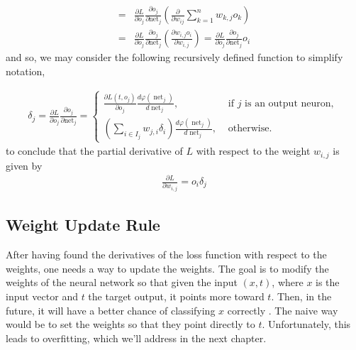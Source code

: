 \documentclass[nobib]{tufte-handout} %
\DeclareMathOperator{\net}{net}
\begin{document}
\begin{enumerate}
\begin{equation}
\begin{split}
    =& {\frac {\partial L}{\partial o_{j}}}{\frac {\partial o_{j}}{\partial {\text{net}}_{j}}} \left(\frac{\partial {}}{\partial {w_{ij}}} {\sum^{n}_{k=1} w_{k,j}o_k}\right) \\ 
    =&{\frac {\partial L}{\partial o_{j}}}{\frac {\partial o_{j}}{\partial {\text{net}}_{j}}} \left(\frac{\partial {w_{i,j} o_i}}{\partial {w_{i,j}}} \right)={\frac {\partial L}{\partial o_{j}}}{\frac {\partial o_{j}}{\partial {\text{net}}_{j}}} o_i
  \end{split}
\end{equation}
   and so, we may consider the following recursively defined function to simplify notation,

\begin{equation*}
  \begin{split}
    \delta_j = {\frac {\partial L}{\partial o_{j}}}{\frac {\partial o_{j}}{\partial {\text{net}}_{j}}}= 
    \begin{cases}
      \frac{\partial {L(t, o_j)}}{\partial {o_j}} \frac{d {\varphi (\net_j)}}{d {\net_j}}, &\text{ if } j \text{ is an output neuron, }\\
      \left( \sum^{}_{i\in I_j} w_{j,i} \delta_i\right) \frac{d {\varphi (\net_j)}}{d {\net_j}} {}, &\text{ otherwise.} 
    \end{cases}
  \end{split}
\end{equation*}
to conclude that the partial derivative of $L$ with respect to the weight $w_{i,j}$ is given by 
\begin{equation*}
  \begin{split}
    \frac{\partial {L}}{\partial {w_{i,j}}} = o_i \delta_j
  \end{split}
\end{equation*}
      \end{enumerate}
\subsection{Weight Update Rule}%
  \label{sub:Weight Update Rule}
  After having found the derivatives of the loss function with respect to the weights, one needs a way to update the weights. The goal is to modify the weights of the neural network so that given the input $(x,t)$, where $x$ is the input vector and $t$ the target output, it points more toward $t$. Then, in the future, it will have a better chance of classifying $x$ correctly \citep{Hagan_Martin}. The naive way would be to set the weights so that they point directly to $t$. Unfortunately, this leads to overfitting, which we'll address in the next chapter.
  
\end{document}
